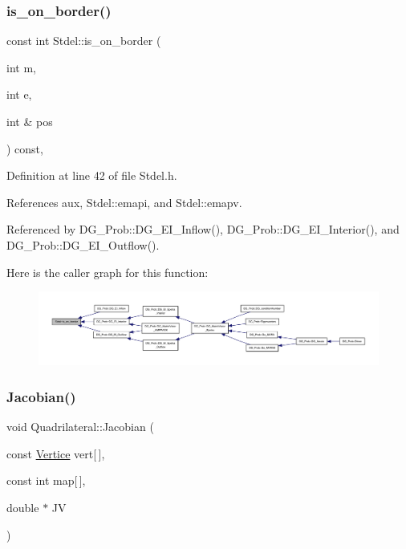 \subsubsection{\texorpdfstring{is\+\_\+on\+\_\+border()}{is\_on\_border()}}
{\footnotesize\ttfamily const int Stdel\+::is\+\_\+on\+\_\+border (\begin{DoxyParamCaption}\item[{int}]{m,  }\item[{int}]{e,  }\item[{int \&}]{pos }\end{DoxyParamCaption}) const\hspace{0.3cm}{\ttfamily [inline]}, {\ttfamily [inherited]}}



Definition at line 42 of file Stdel.\+h.



References aux, Stdel\+::emapi, and Stdel\+::emapv.



Referenced by D\+G\+\_\+\+Prob\+::\+D\+G\+\_\+\+E\+I\+\_\+\+Inflow(), D\+G\+\_\+\+Prob\+::\+D\+G\+\_\+\+E\+I\+\_\+\+Interior(), and D\+G\+\_\+\+Prob\+::\+D\+G\+\_\+\+E\+I\+\_\+\+Outflow().

Here is the caller graph for this function\+:
\nopagebreak
\begin{figure}[H]
\begin{center}
\leavevmode
\includegraphics[width=350pt]{classStdel_abb022f0ad81707e11e3a3091d2d87c46_icgraph}
\end{center}
\end{figure}
\mbox{\label{classQuadrilateral_af35d0775bd010cf4987925a035b1ec35}} 
\subsubsection{\texorpdfstring{Jacobian()}{Jacobian()}}
{\footnotesize\ttfamily void Quadrilateral\+::\+Jacobian (\begin{DoxyParamCaption}\item[{const \hyperlink{structVertice}{Vertice}}]{vert\mbox{[}$\,$\mbox{]},  }\item[{const int}]{map\mbox{[}$\,$\mbox{]},  }\item[{double $\ast$}]{JV }\end{DoxyParamCaption})\hspace{0.3cm}{\ttfamily [virtual]}}



